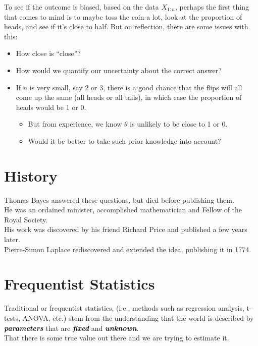 \documentclass[14pt]{extarticle}
\newcommand{\mynotes}[2][Gray]{\textcolor{#1}{\textbf{\textit{#2}}}}
\begin{document}
To see if the outcome is biased, based on the data $X_{1:n}$, perhaps the first thing that comes to mind is to maybe toss the coin a lot, look at the proportion of heads, and see if it’s close to half. But on reflection, there are some issues with this:
\begin{itemize}
	\item How close is ``close''?
	\item How would we quantify our uncertainty about the correct answer?
	\item If $n$ is very small, say 2 or 3, there is a good chance that the flips will all come up the same (all heads or all tails), in which case the proportion of heads would be 1 or 0. 
	\begin{itemize}
		\item But from experience, we know $\theta$ is unlikely to be close to 1 or 0. 
		\item Would it be better to take such prior knowledge into account?
	\end{itemize}
\end{itemize}

\section{History}

Thomas Bayes answered these questions, but died before publishing them. \\

He was an ordained minister, accomplished mathematician and Fellow of the Royal Society. \\

His work was discovered by his friend Richard Price and published a few years later. \\

Pierre-Simon Laplace rediscovered and extended the idea, publishing it in 1774.

\section{Frequentist Statistics}

Traditional or frequentist statistics, (i.e., methods such as regression analysis, t-tests, ANOVA, etc.) stem from the understanding that the world is described by \mynotes[black]{parameters} that are \mynotes[black]{fixed} and \mynotes[black]{unknown}. \\

That there is some true value out there and we are trying to estimate it. \\
\end{document}
